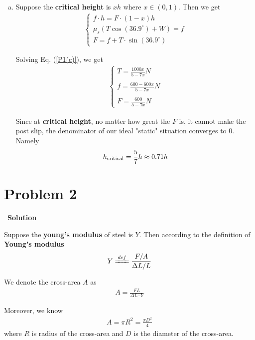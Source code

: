 \documentclass[12pt,a4paper]{article}
\begin{document}
\begin{enumerate}[(a)]
	\item Suppose the \textbf{critical height} is $xh$ where $x \in (0,1)$. Then we get
	\begin{align}
	\left\{
		\begin{array}{l}			
				f \cdot h = F \cdot \left( 1-x \right)h\\
				\mu_s(T\cos(36.9^\circ) + W) = f\\
				F = f + T \cdot \sin(36.9^\circ)
		\end{array}
	\right.
	\label{P1(c)}
	\end{align}
	
	Solving Eq. (\ref{P1(c)}), we get
	\begin{align}
	\left\{
		\begin{array}{l}			
				T = \frac{1000x}{5-7x} N\\
				\\
				f = \frac{600-600x}{5-7x} N\\
				\\
				F = \frac{600}{5-7x} N
		\end{array}
	\right.
	\label{P1(c)_sol}
	\end{align}
	
	Since at \textbf{critical height}, no matter how great the $F$ is, it cannot make the post slip, the denominator of our ideal "static" situation converges to 0. Namely
	\begin{align}
		h_{\rm critical} = \frac{5}{7} h \approx 0.71 h
	\end{align}	
\end{enumerate}

\section*{\large \textbf{Problem 2}}~{\textbf{Solution}}

Suppose the \textbf{young's modulus} of steel is $Y$. Then according to the definition of \textbf{Young's modulus}
\begin{align}
	Y \xlongequal{def} \frac{F/A}{\Delta L/L}
\end{align}

We denote the cross-area $A$ as
\begin{align}
	A = \frac{FL}{\Delta L \cdot Y}
	\label{P2_corss-area}
\end{align}

Moreover, we know
\begin{align}
	A = \pi R^2 = \frac{\pi D^2}{4}
	\label{P2_area}
\end{align}
where $R$ is radius of the cross-area and $D$ is the diameter of the cross-area.
\end{document}
